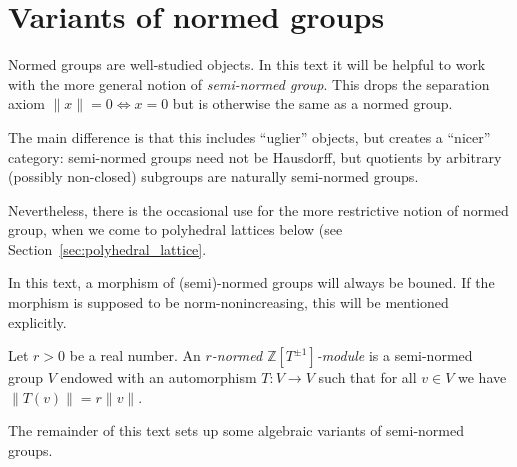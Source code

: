 \section{Variants of normed groups}

\begin{remark}
  Normed groups are well-studied objects.
  In this text it will be helpful to work with
  the more general notion of \emph{semi-normed group}.
  This drops the separation axiom $\|x\| = 0 \iff x = 0$
  but is otherwise the same as a normed group.

  The main difference is that this includes ``uglier'' objects,
  but creates a ``nicer'' category:
  semi-normed groups need not be Hausdorff,
  but quotients by arbitrary (possibly non-closed) subgroups
  are naturally semi-normed groups.

  Nevertheless, there is the occasional use for the more restrictive
  notion of normed group, when we come to polyhedral lattices below
  (see Section~\ref{sec:polyhedral_lattice}.

  In this text, a morphism of (semi)-normed groups will always be bouned.
  If the morphism is supposed to be norm-nonincreasing,
  this will be mentioned explicitly.
\end{remark}

\begin{definition}
  \label{normed_with_aut}
  \leanok
  Let $r > 0$ be a real number.
  An \emph{$r$-normed $\mathbb Z[T^{\pm 1}]$-module}
  is a semi-normed group $V$
  endowed with an automorphism $T \colon V \to V$ such that
  for all $v \in V$ we have $\|T(v)\| = r\|v\|$.
\end{definition}

The remainder of this text sets up some algebraic variants of semi-normed groups.

